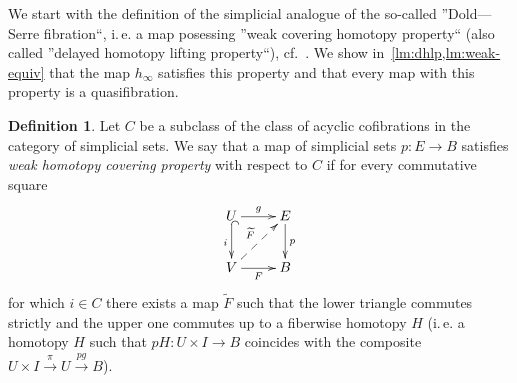 \documentclass[oneside, 12pt]{amsart}
\theoremstyle{plain}
\numberwithin{equation}{section}
\numberwithin{lemma}{section}
\theoremstyle{remark}
\theoremstyle{definition}
\newtheorem{df}[lemma]{Definition} \Crefname{df}{Definition}{Definitions}
\begin{document}
We start with the definition of the simplicial analogue of the so-called ''Dold---Serre fibration``, i.\,e.
a map posessing ''weak covering homotopy property`` (also called ''delayed homotopy lifting property``), cf.~\cite[\S~1.4.4]{KSz14}.
We show in~\cref{lm:dhlp,lm:weak-equiv} that the map $h_\infty$ satisfies this property and that every map with this property is a quasifibration.
 
\begin{df} \label{df:dhlp}
 Let $C$ be a subclass of the class of acyclic cofibrations in the category of simplicial sets.
 We say that a map of simplicial sets $p\colon E \to B$ satisfies {\it weak homotopy covering property} with respect to $C$ if 
  for every commutative square
\begin{equation} \xymatrix{ 
U \ar[r]^{g}  \ar@{^{(}->}_{i}[d] & E \ar^{p}[d] \\
V \ar[r]_{F} \ar@{-->}[ru]^{\widetilde{F}} & B}
\label{eq:plp-def} \end{equation}
for which $i \in C$ there exists a map $\widetilde{F}$ such that the lower triangle commutes strictly and the upper one commutes up to a fiberwise homotopy $H$
 (i.\,e. a homotopy $H$ such that $pH \colon U \times I \to B$ coincides with the composite $U \times I \xrightarrow{\pi} U \xrightarrow{pg} B$).
\end{df}
\end{document}
